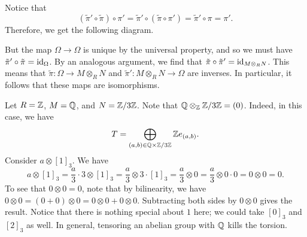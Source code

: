 \begin{pf}
\begin{center}
    \end{center} 
    Notice that 
    \[ (\tilde\pi' \circ \tilde\pi) \circ \pi' 
    = \tilde\pi' \circ (\tilde\pi \circ \pi') 
    = \tilde\pi' \circ \pi = \pi'. \] 
    Therefore, we get the following diagram. 
    \begin{center}
    \end{center}
    But the map $\Omega \to \Omega$ is unique by the universal property, 
    and so we must have $\tilde\pi' \circ \tilde\pi = \operatorname{id}_\Omega$. By 
    an analogous argument, we find that $\tilde\pi \circ \tilde\pi' = 
    \operatorname{id}_{M \otimes_R N}$. This means that $\tilde\pi : \Omega 
    \to M \otimes_R N$ and $\tilde\pi' : M \otimes_R N \to \Omega$ are 
    inverses. In particular, it follows that these maps are isomorphisms. 
\end{pf}

\begin{exmp}{}
    Let $R = \mathbb{Z}$, $M = \mathbb{Q}$, and $N = \mathbb{Z}/3\mathbb{Z}$. Note that 
    $\mathbb{Q} \otimes_{\mathbb{Z}} \mathbb{Z}/3\mathbb{Z} = (0)$. Indeed, in this case, we have 
    \[ T = \bigoplus_{(a, b) \in \mathbb{Q} \times \mathbb{Z}/3\mathbb{Z}} \mathbb{Z} e_{(a, b)}. \] 
    Consider $a \otimes [1]_3$. We have 
    \[ a \otimes [1]_3 = \frac{a}3 \cdot 3 \otimes [1]_3 
    = \frac{a}3 \otimes 3 \cdot [1]_3 = \frac{a}3 \otimes 0
    = \frac{a}3 \otimes 0 \cdot 0 = 0 \otimes 0 = 0. \] 
    To see that $0 \otimes 0 = 0$, note that by bilinearity, we have 
    $0 \otimes 0 = (0 + 0) \otimes 0 = 0 \otimes 0 + 0 \otimes 0$.
    Subtracting both sides by $0 \otimes 0$ gives the result. 
    Notice that there is nothing special about $1$ here; we could take 
    $[0]_3$ and $[2]_3$ as well. 
    In general, tensoring an abelian group with $\mathbb{Q}$ kills the torsion.
\end{exmp}

